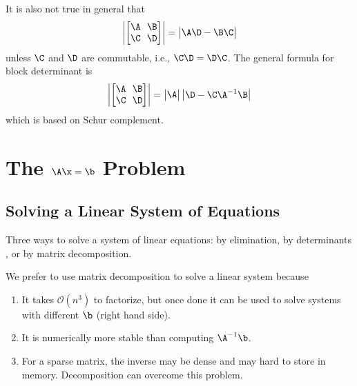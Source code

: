 It is also not true in general that
\begin{align*}
    \begin{vmatrix}\left[\begin{matrix}\A ~~ \B \\ \C ~~  \D\end{matrix}\right]\end{vmatrix} = \begin{vmatrix}\A\D-\B\C\end{vmatrix}
\end{align*}
unless $\C$ and $\D$ are commutable, i.e., $\C\D = \D\C$. The general formula for block determinant is
\begin{align}
    \begin{vmatrix}\left[\begin{matrix}\A ~~ \B \\ \C ~~  \D\end{matrix}\right]\end{vmatrix} = \begin{vmatrix}\A\end{vmatrix}\begin{vmatrix}\D - \C\A^{-1}\B\end{vmatrix}
\end{align}
which is based on Schur complement.


\chapter{The $\A\x=\b$ Problem}
\section{Solving a Linear System of Equations}
\begin{rmk}
	Three ways to solve a system of linear equations: by elimination, by determinants {\color{red}{(Cramer's Rule???)}}, or by matrix decomposition.
\end{rmk}

\begin{rmk}
	We prefer to use matrix decomposition to solve a linear system because
	\begin{enumerate}
		\item It takes $\mathcal{O}(n^3)$ to factorize, but once done it can be used to solve systems with different $\b$ (right hand side).
		\item It is numerically more stable than computing $\A^{-1}\b$.
		\item For a sparse matrix, the inverse may be dense and may hard to store in memory. Decomposition can overcome this problem.
	\end{enumerate}
\end{rmk}

